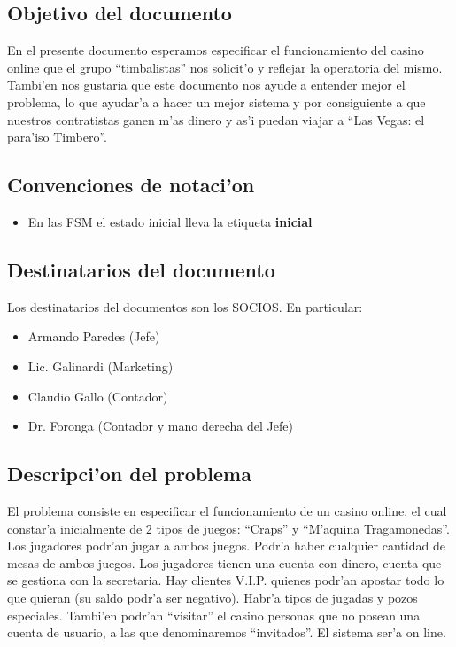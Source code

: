 \subsection{ Objetivo del documento	}
En el presente documento esperamos especificar el funcionamiento del casino online 
que el grupo ``timbalistas'' nos solicit'o y reflejar la operatoria
del mismo. Tambi'en nos gustaria que este documento nos ayude a entender mejor el problema, 
lo que ayudar'a a hacer un mejor sistema y por consiguiente a que nuestros contratistas ganen m'as dinero
y as'i puedan viajar a ``Las Vegas: el para'iso Timbero''.


\subsection{ Convenciones de notaci'on	}
\begin{itemize}
    \item En las FSM el estado inicial lleva la etiqueta \textbf{inicial}
\end{itemize}


\subsection{ Destinatarios del documento	}
Los destinatarios del documentos son los SOCIOS. En particular:

\begin{itemize}
    \item Armando Paredes (Jefe)
    \item Lic. Galinardi (Marketing)
    \item Claudio Gallo (Contador)
    \item Dr. Foronga (Contador y mano derecha del Jefe)
\end{itemize}


\subsection{ Descripci'on del problema }

El problema consiste en especificar el funcionamiento de un casino online, el cual constar'a inicialmente de 2 tipos
de juegos: ``Craps'' y ``M'aquina Tragamonedas''. Los jugadores podr'an jugar a ambos juegos. Podr'a haber
cualquier cantidad de mesas de ambos juegos. Los jugadores tienen una cuenta con dinero, cuenta que se gestiona con la secretaria.
Hay clientes V.I.P. quienes podr'an apostar todo lo que quieran (su saldo podr'a ser negativo).
Habr'a tipos de jugadas y pozos especiales. Tambi'en podr'an ``visitar'' el casino personas que no posean una cuenta de usuario, a las que denominaremos ``invitados''.
El sistema ser'a on line.


